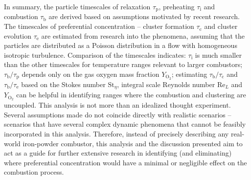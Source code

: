 \documentclass[authoryear,preprint,review,12pt]{elsarticle}
\newcommand{\mrm}[1]{\mathrm{#1}}
\newcommand{\taup}{\tau_\mathrm{p}}
\newcommand{\taui}{\tau_\mathrm{i}}
\newcommand{\taub}{\tau_\mathrm{b}}
\newcommand{\tauc}{\tau_\mathrm{c}}
\newcommand{\taue}{\tau_\mathrm{e}}
\newcommand{\blue}{}
\begin{document}
{In summary, the particle timescales of relaxation $\taup$, preheating $\taui$ and combustion $\taub$ are derived based on assumptions motivated by recent research. The timescales of preferential concentration -- cluster formation $\tauc$ and cluster evolution $\taue$ are estimated from research into the phenomena, assuming that the particles are distributed as a Poisson distribution in a flow with homogeneous isotropic turbulence. Comparison of the timescales indicates: $\taui$ is much smaller than the other timescales for temperature ranges relevant to larger combustors; $\taub/\taup$ depends only on the gas oxygen mass fraction $Y_\mrm{O_2}$; estimating $\taub/\tauc$ and $\taub/\taue$ based on the Stokes number $\mrm{St}_\eta$, integral scale Reynolds number $\mrm{Re}_L$ and $Y_\mrm{O_2}$ can be helpful in identifying ranges where the combustion and clustering are uncoupled.} {\blue This analysis is not more than an idealized thought experiment. Several assumptions made do not coincide directly with realistic scenarios -- scenarios that have several complex dynamic phenomena that cannot be feasibly incorporated in this analysis. Therefore, instead of precisely describing any real-world iron-powder combustor, this analysis and the discussion presented aim to act as a guide for further extensive research in identifying (and eliminating) where preferential concentration would have a minimal or negligible effect on the combustion process.}
\end{document}

